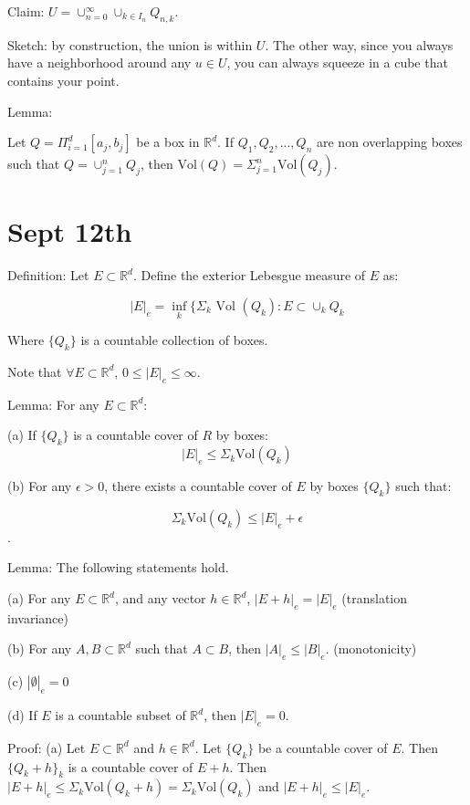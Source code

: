 \documentclass[10pt]{article}
\begin{document}
Claim: $ U = \cup_{n=0}^{\infty} \cup_{k \in I_n} Q_{n,k} $.

Sketch: by construction, the union is within $U$. The other way, since you always have a neighborhood around any $u \in U$, you can always squeeze in a cube that contains your point.

Lemma: 

Let $Q = \Pi_{i=1}^d [a_j,b_j]$ be a box in $\mathbb{R}^d$. If $Q_1, Q_2, ..., Q_n$ are non overlapping boxes such that $Q= \cup_{j=1}^n Q_j$, then $\text{Vol}(Q) = \Sigma_{j=1}^n \text{Vol}(Q_j)$.

\section*{Sept 12th}

Definition: Let $E \subset \mathbb{R}^d$. Define the exterior Lebesgue measure of $E$ as:

$$ |E|_e = \inf_k \{ \Sigma_k \text{ Vol }( Q_k ) : E \subset \cup_k Q_k $$

Where $\{ Q_k \}$ is a countable collection of boxes.

Note that $\forall E \subset \mathbb{R}^d$, $0 \leq |E|_e \leq \infty$.

Lemma: For any $E \subset \mathbb{R}^d$:

(a) If $\{ Q_k \}$ is a countable cover of $R$ by boxes:
$$ |E|_e \leq \Sigma_k \text{Vol}(Q_k)$$

(b) For any $\epsilon > 0$, there exists a countable cover of $E$ by boxes $\{ Q_k \}$ such that:

$$\Sigma_k \text{Vol}(Q_k) \leq |E|_e + \epsilon$$.

Lemma: The following statements hold.

(a) For any $E \subset \mathbb{R}^d$, and any vector $h \in \mathbb{R}^d$, $|E+h|_e = |E|_e$ (translation invariance)

(b) For any $A,B \subset \mathbb{R}^d$ such that $A \subset B$, then $|A|_e \leq |B|_e$. (monotonicity)

(c) $|\emptyset|_e = 0$

(d) If $E$ is a countable subset of $\mathbb{R}^d$, then $|E|_e = 0$.

Proof: (a) Let $E \subset \mathbb{R}^d$ and $h \in \mathbb{R}^d$. Let $\{ Q_k \}$ be a countable cover of $E$. Then $\{ Q_k + h \}_k$ is a countable cover of $E+h$.
Then $|E+h|_e \leq \Sigma_k \text{Vol}(Q_k + h) = \Sigma_k \text{Vol}(Q_k)$ and $|E+h|_e \leq |E|_e$.
\end{document}
